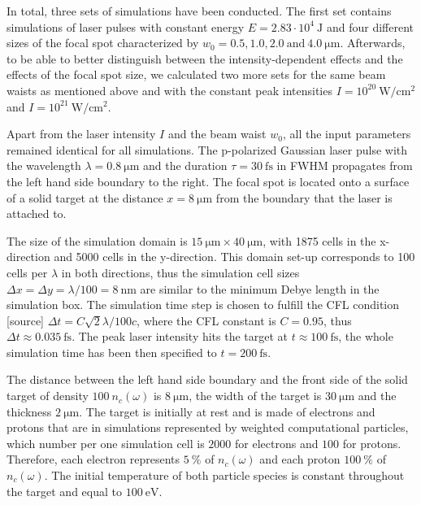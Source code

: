 In total, three sets of simulations have been conducted. The first set contains simulations of laser pulses with constant energy $ E = 2.83 \cdot 10^{4} \ \mathrm{J} $ and four different sizes of the focal spot characterized by $ w_0 = 0.5, 1.0, 2.0 \ \mathrm{and} \ 4.0 \ \mathrm{\mu m} $. Afterwards, to be able to better distinguish between the intensity-dependent effects and the effects of the focal spot size, we calculated two more sets for the same beam waists as mentioned above and with the constant peak intensities $ I = 10^{20} \ \mathrm{W/cm^2} $ and $ I = 10^{21} \ \mathrm{W/cm^2} $.

Apart from the laser intensity $ I $ and the beam waist $ w_0 $, all the input parameters remained identical for all simulations. The p-polarized Gaussian laser pulse with the wavelength $ \lambda = 0.8 \ \mathrm{\mu m} $ and the duration $ \tau = 30 \ \mathrm{fs} $ in FWHM propagates from the left hand side boundary to the right. The focal spot is located onto a surface of a solid target at the distance $ x = 8 \ \mathrm{\mu m} $ from the boundary that the laser is attached to. 

The size of the simulation domain is $ 15 \ \mathrm{\mu m} \times 40 \ \mathrm{\mu m} $, with 1875 cells in the x-direction and 5000 cells in the y-direction. This domain set-up corresponds to 100 cells per $ \lambda $ in both directions, thus the simulation cell sizes $ \Delta x = \Delta y = \lambda/100 = 8 \ \mathrm{nm} $ are similar to the minimum Debye length in the simulation box. The simulation time step is chosen to fulfill the CFL condition [source] $ \Delta t = C \sqrt{2} \lambda/ 100 c $, where the CFL constant is $ C = 0.95 $, thus $ \Delta t \approx 0.035 \ \mathrm{fs} $. The peak laser intensity hits the target at $ t \approx 100 \ \mathrm{fs} $, the whole simulation time has been then specified to $ t = 200 \ \mathrm{fs} $.

The distance between the left hand side boundary and the front side of the solid target of density $ 100 \ n_c \left(\omega \right) $ is $ 8 \ \mathrm{\mu m} $, the width of the target is $ 30 \ \mathrm{\mu m} $ and the thickness $ 2 \ \mathrm{\mu m} $. The target is initially at rest and is made of electrons and protons that are in simulations represented by weighted computational particles, which number per one simulation cell is $ 2000 $ for electrons and $ 100 $ for protons. Therefore, each electron represents $ 5 \ \% $ of $ n_c \left(\omega \right) $ and each proton $ 100 \ \% $ of $ n_c \left(\omega \right) $. The initial temperature of both particle species is constant throughout the target and equal to $ 100 \ \mathrm{eV} $.

